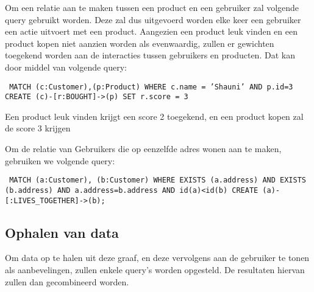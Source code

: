 Om een relatie aan te maken tussen een product en een gebruiker zal volgende query gebruikt worden. Deze zal dus uitgevoerd worden elke keer een gebruiker een actie uitvoert met een product.
Aangezien een product leuk vinden en een product kopen niet aanzien worden als evenwaardig, zullen er gewichten toegekend worden aan de interacties tussen gebruikers en producten.  Dat kan door middel van volgende query:


\texttt{
	MATCH (c:Customer),(p:Product) \newline
	WHERE c.name = 'Shauni' AND p.id=3 \newline
	CREATE (c)-[r:BOUGHT]->(p) \newline
	SET r.score = 3
}

Een product leuk vinden krijgt een score 2 toegekend, en een product kopen zal de score 3 krijgen

Om de relatie van Gebruikers die op eenzelfde adres wonen aan te maken, gebruiken we volgende query: 

\texttt{
MATCH (a:Customer), (b:Customer) \newline
WHERE EXISTS (a.address) AND EXISTS (b.address) AND a.address=b.address AND id(a)<id(b) \newline
CREATE (a)-[:LIVES\_TOGETHER]->(b); \newline
}

\subsection{Ophalen van data}
\label{sec:Ophalen van data}

Om data op te halen uit deze graaf, en deze vervolgens aan de gebruiker te tonen als aanbevelingen, zullen enkele query's worden opgesteld. De resultaten hiervan zullen dan gecombineerd worden. 









